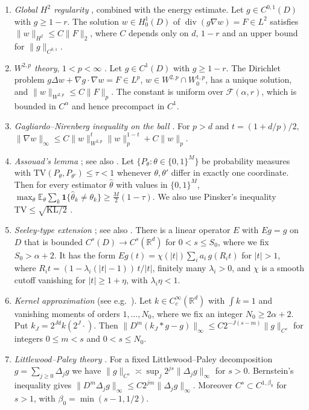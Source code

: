 \documentclass[11pt]{article}
\theoremstyle{definition}
\theoremstyle{remark}
\newcommand{\R}{\mathbb R}
\newcommand{\E}{\mathbb E}
\newcommand{\one}{\mathbf 1}
\newcommand{\Fc}{\mathcal F}
\newcommand{\dv}{\operatorname{div}}
\newcommand{\KL}{\mathrm{KL}}
\newcommand{\TV}{\mathrm{TV}}
\begin{document}
\begin{enumerate}[label=\textbf{(\arabic*)},leftmargin=2.2em]
\item[\textbf{(E1)}] \emph{Global $H^2$ regularity} \cite[Theorem 8.12]{GT}, combined with the energy estimate. Let $g\in C^{0,1}(D)$ with $g\ge1-r$. The solution $w\in H^1_0(D)$ of $\dv(g\nabla w)=F\in L^2$ satisfies $\|w\|_{H^2}\le C\|F\|_2$, where $C$ depends only on $d$, $1-r$ and an upper bound for $\|g\|_{C^{0,1}}$.
\item[\textbf{(E2)}] \emph{$W^{2,p}$ theory}, $1<p<\infty$ \cite[Theorem 9.15, Lemma 9.17]{GT}. Let $g\in C^1(D)$ with $g\ge1-r$. The Dirichlet problem $g\Delta w+\nabla g\cdot\nabla w=F\in L^p$, $w\in W^{2,p}\cap W^{1,p}_0$, has a unique solution, and $\|w\|_{W^{2,p}}\le C\|F\|_p$. The constant is uniform over $\Fc(\alpha,r)$, which is bounded in $C^\alpha$ and hence precompact in $C^1$.
\item[\textbf{(GN)}] \emph{Gagliardo--Nirenberg inequality on the ball} \cite{Gag59,Nir59}. For $p>d$ and $t=(1+d/p)/2$,
$\|\nabla w\|_\infty\le C\|w\|^t_{W^{2,p}}\|w\|^{1-t}_p+C\|w\|_p$.
\item[\textbf{(As)}] \emph{Assouad's lemma} \cite{Ass83}; see also \cite[Ch.~2]{Tsy09}. Let $\{P_\theta:\theta\in\{0,1\}^M\}$ be probability measures with $\TV(P_\theta,P_{\theta'})\le\tau<1$ whenever $\theta,\theta'$ differ in exactly one coordinate. Then for every estimator $\hat\theta$ with values in $\{0,1\}^M$,
$\max_\theta\E_\theta\sum_k\one\{\hat\theta_k\neq\theta_k\}\ge\frac M2(1-\tau)$.
We also use Pinsker's inequality $\TV\le\sqrt{\KL/2}$ \cite[Ch.~2]{Tsy09}.
\item[\textbf{(C1)}] \emph{Seeley-type extension} \cite{See64}; see also \cite{Tri83}. There is a linear operator $E$ with $Eg=g$ on $D$ that is bounded $C^s(D)\to C^s(\R^d)$ for $0<s\le S_0$, where we fix $S_0>\alpha+2$. It has the form $Eg(t)=\chi(|t|)\sum_ia_i\,g(R_it)$ for $|t|>1$, where $R_it=(1-\lambda_i(|t|-1))\,t/|t|$, finitely many $\lambda_i>0$, and $\chi$ is a smooth cutoff vanishing for $|t|\ge1+\eta$, with $\lambda_i\eta<1$.
\item[\textbf{(C2)}] \emph{Kernel approximation} (see e.g.\ \cite{GN16}). Let $k\in C^\infty_c(\R^d)$ with $\int k=1$ and vanishing moments of orders $1,\dots,N_0$, where we fix an integer $N_0\ge2\alpha+2$. Put $k_J=2^{Jd}k(2^J\cdot)$. Then $\|D^m(k_J*g-g)\|_\infty\le C2^{-J(s-m)}\|g\|_{C^s}$ for integers $0\le m<s$ and $0<s\le N_0$.
\item[\textbf{(LP)}] \emph{Littlewood--Paley theory} \cite{Tri83,GN16}. For a fixed Littlewood--Paley decomposition $g=\sum_{j\ge0}\Delta_jg$ we have $\|g\|_{C^s}\asymp\sup_j2^{js}\|\Delta_jg\|_\infty$ for $s>0$. Bernstein's inequality gives $\|D^m\Delta_jg\|_\infty\le C2^{jm}\|\Delta_jg\|_\infty$. Moreover $C^s\subset C^{1,\beta_0}$ for $s>1$, with $\beta_0=\min(s-1,1/2)$.

\end{enumerate}
\end{document}
